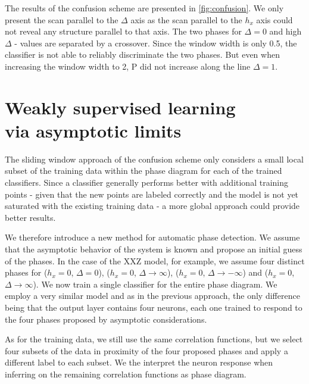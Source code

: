 \documentclass[prl, reprint, twocolumn]{revtex4-1}
\begin{document}
	The results of the confusion scheme are presented in \ref{fig:confusion}. We only present the scan parallel to the $\Delta$ axis as the scan parallel to the $h_x$  axis could not reveal any structure parallel to that axis. The two phases for $\Delta = 0$ and high $\Delta$ - values are separated by a crossover. Since the window width is only 0.5, the classifier is not able to reliably discriminate the two phases. But even when increasing the window width to 2, P did not increase along the line $\Delta=1$.
	
	\section{Weakly supervised learning \\ via asymptotic limits}
	The sliding window approach of the confusion scheme only considers a small local subset of the training data within the phase diagram for each of the trained classifiers.
	Since a classifier generally performs better with additional training points - given that the new points are labeled correctly and the model is not yet saturated with the existing training data \cite{}- a more global approach could provide better results.
	
	We therefore introduce a new method for automatic phase detection. We assume that the asymptotic behavior of the system is known and propose an initial guess of the phases. In the case of the XXZ model, for example, we assume four distinct phases for ($h_x=0$, $\Delta=0$), ($h_x=0$, $\Delta\rightarrow\infty$), ($h_x=0$, $\Delta\rightarrow -\infty$) and ($h_x=0$, $\Delta\rightarrow\infty$). We now train a single classifier for the entire phase diagram. We employ a very similar model and as in the previous approach, the only difference being that the output layer contains four neurons, each one trained to respond to the four phases proposed by asymptotic considerations.
	
	As for the training data, we still use the same correlation functions, but we select four subsets of the data in proximity of the four proposed phases and apply a different label to each subset. We the interpret the neuron response when inferring on the remaining correlation functions as phase diagram. 
	
	
	
\end{document}
